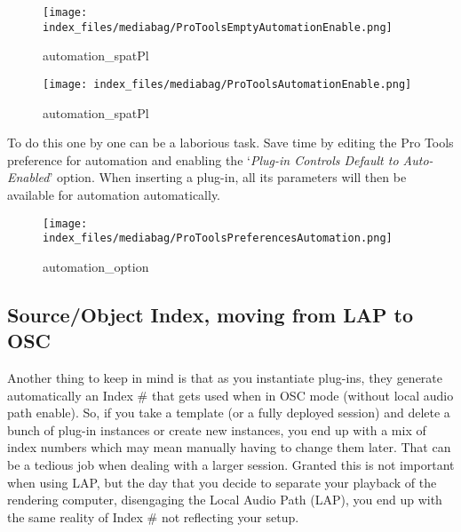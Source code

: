 \documentclass[
  letterpaper,
  DIV=11,
  numbers=noendperiod]{scrreport}
\begin{document}
\begin{figure}

{\centering \texttt{[image: index\_files/mediabag/ProToolsEmptyAutomationEnable.png]}

}

\caption{automation\_spatPl}

\end{figure}

\begin{figure}

{\centering \texttt{[image: index\_files/mediabag/ProToolsAutomationEnable.png]}

}

\caption{automation\_spatPl}

\end{figure}

To do this one by one can be a laborious task. Save time by editing the
Pro Tools preference for automation and enabling the `\emph{Plug-in
Controls Default to Auto-Enabled}' option. When inserting a plug-in, all
its parameters will then be available for automation automatically.

\begin{figure}

{\centering \texttt{[image: index\_files/mediabag/ProToolsPreferencesAutomation.png]}

}

\caption{automation\_option}

\end{figure}

\hypertarget{sourceobject-index-moving-from-lap-to-osc}{%
\subsection{Source/Object Index, moving from LAP to
OSC}\label{sourceobject-index-moving-from-lap-to-osc}}

Another thing to keep in mind is that as you instantiate plug-ins, they
generate automatically an Index \# that gets used when in OSC mode
(without local audio path enable). So, if you take a template (or a
fully deployed session) and delete a bunch of plug-in instances or
create new instances, you end up with a mix of index numbers which may
mean manually having to change them later. That can be a tedious job
when dealing with a larger session. Granted this is not important when
using LAP, but the day that you decide to separate your playback of the
rendering computer, disengaging the Local Audio Path (LAP), you end up
with the same reality of Index \# not reflecting your setup.
\end{document}
